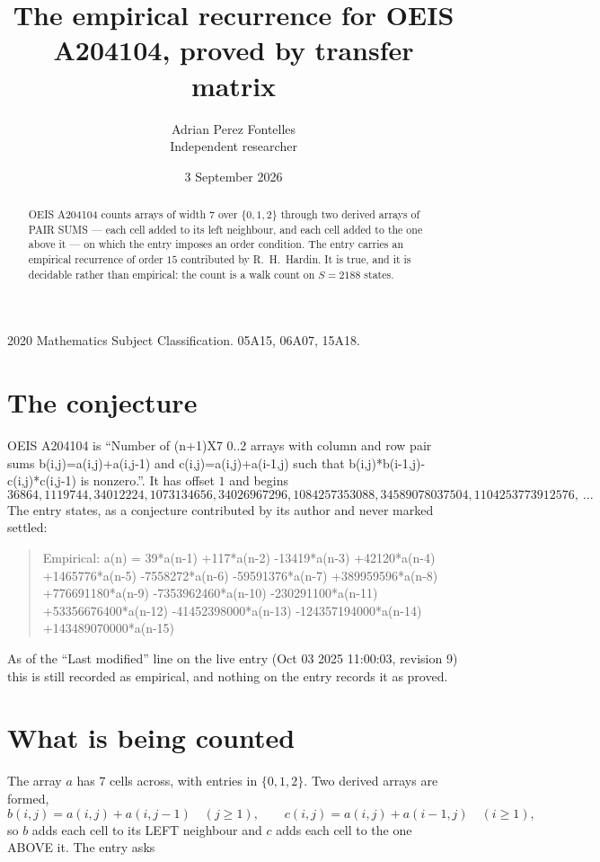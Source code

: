 \documentclass[11pt,a4paper]{article}
\title{The empirical recurrence for OEIS A204104, proved by transfer matrix}
\author{Adrian Perez Fontelles\\ \small Independent researcher}
\date{3 September 2026}
\theoremstyle{plain}
\theoremstyle{definition}
\begin{document}
\maketitle

\begin{abstract}
OEIS A204104 counts arrays of width $7$ over $\{0,1,2\}$ through two derived arrays of PAIR SUMS ---
each cell added to its left neighbour, and each cell added to the one above it --- on which the
entry imposes an order condition. The entry carries an empirical recurrence of order $15$
contributed by R.~H.~Hardin. It is true, and it is decidable rather than empirical: the count is
a walk count on $S=2188$ states.
\end{abstract}

\noindent\small 2020 Mathematics Subject Classification. 05A15, 06A07, 15A18.\normalsize

\section{The conjecture}

OEIS A204104 is ``Number of (n+1)X7 0..2 arrays with column and row pair sums b(i,j)=a(i,j)+a(i,j-1) and c(i,j)=a(i,j)+a(i-1,j) such that b(i,j)*b(i-1,j)-c(i,j)*c(i,j-1) is nonzero.''. It has offset $1$ and begins
\[
36864, 1119744, 34012224, 1073134656, 34026967296, 1084257353088, 34589078037504, 1104253773912576,\ \dots
\]
The entry states, as a conjecture contributed by its author and never marked settled:
\begin{quote}
Empirical: a(n) = 39*a(n-1) +117*a(n-2) -13419*a(n-3) +42120*a(n-4) +1465776*a(n-5) -7558272*a(n-6) -59591376*a(n-7) +389959596*a(n-8) +776691180*a(n-9) -7353962460*a(n-10) -230291100*a(n-11) +53356676400*a(n-12) -41452398000*a(n-13) -124357194000*a(n-14) +143489070000*a(n-15)
\end{quote}
As of the ``Last modified'' line on the live entry (Oct 03 2025 11:00:03, revision 9) this is still
recorded as empirical, and nothing on the entry records it as proved.

\section{What is being counted}

The array $a$ has $7$ cells across, with entries in $\{0,1,2\}$. Two derived arrays are formed,
\[
b(i,j)=a(i,j)+a(i,j-1)\quad(j\ge1),\qquad c(i,j)=a(i,j)+a(i-1,j)\quad(i\ge1),
\]
so $b$ adds each cell to its LEFT neighbour and $c$ adds each cell to the one ABOVE it. The
entry asks
\end{document}
